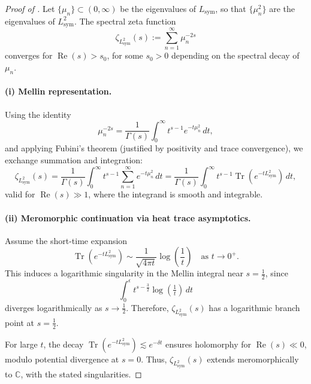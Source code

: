 \begin{proof}[Proof of ]
Let \( \{ \mu_n \} \subset (0, \infty) \) be the eigenvalues of \( L_{\mathrm{sym}} \), so that \( \{ \mu_n^2 \} \) are the eigenvalues of \( L_{\mathrm{sym}}^2 \). The spectral zeta function
\[
\zeta_{L_{\mathrm{sym}}^2}(s) := \sum_{n=1}^\infty \mu_n^{-2s}
\]
converges for \( \operatorname{Re}(s) > s_0 \), for some \( s_0 > 0 \) depending on the spectral decay of \( \mu_n \).

\paragraph{(i) Mellin representation.}
Using the identity
\[
\mu_n^{-2s} = \frac{1}{\Gamma(s)} \int_0^\infty t^{s-1} e^{-t \mu_n^2} \, dt,
\]
and applying Fubini’s theorem (justified by positivity and trace convergence), we exchange summation and integration:
\[
\zeta_{L_{\mathrm{sym}}^2}(s)
= \frac{1}{\Gamma(s)} \int_0^\infty t^{s-1} \sum_{n=1}^\infty e^{-t \mu_n^2} \, dt
= \frac{1}{\Gamma(s)} \int_0^\infty t^{s-1} \operatorname{Tr}(e^{-t L_{\mathrm{sym}}^2}) \, dt,
\]
valid for \( \operatorname{Re}(s) \gg 1 \), where the integrand is smooth and integrable.

\paragraph{(ii) Meromorphic continuation via heat trace asymptotics.}
Assume the short-time expansion
\[
\operatorname{Tr}(e^{-t L_{\mathrm{sym}}^2}) \sim \frac{1}{\sqrt{4\pi t}} \log\left( \frac{1}{t} \right)
\quad \text{as } t \to 0^+.
\]
This induces a logarithmic singularity in the Mellin integral near \( s = \tfrac{1}{2} \), since
\[
\int_0^\epsilon t^{s - \frac{3}{2}} \log\left( \tfrac{1}{t} \right) \, dt
\]
diverges logarithmically as \( s \to \tfrac{1}{2} \). Therefore, \( \zeta_{L_{\mathrm{sym}}^2}(s) \) has a logarithmic branch point at \( s = \tfrac{1}{2} \).

For large \( t \), the decay \( \operatorname{Tr}(e^{-t L_{\mathrm{sym}}^2}) \lesssim e^{-\delta t} \) ensures holomorphy for \( \operatorname{Re}(s) \ll 0 \), modulo potential divergence at \( s = 0 \). Thus, \( \zeta_{L_{\mathrm{sym}}^2}(s) \) extends meromorphically to \( \mathbb{C} \), with the stated singularities.
\end{proof}
